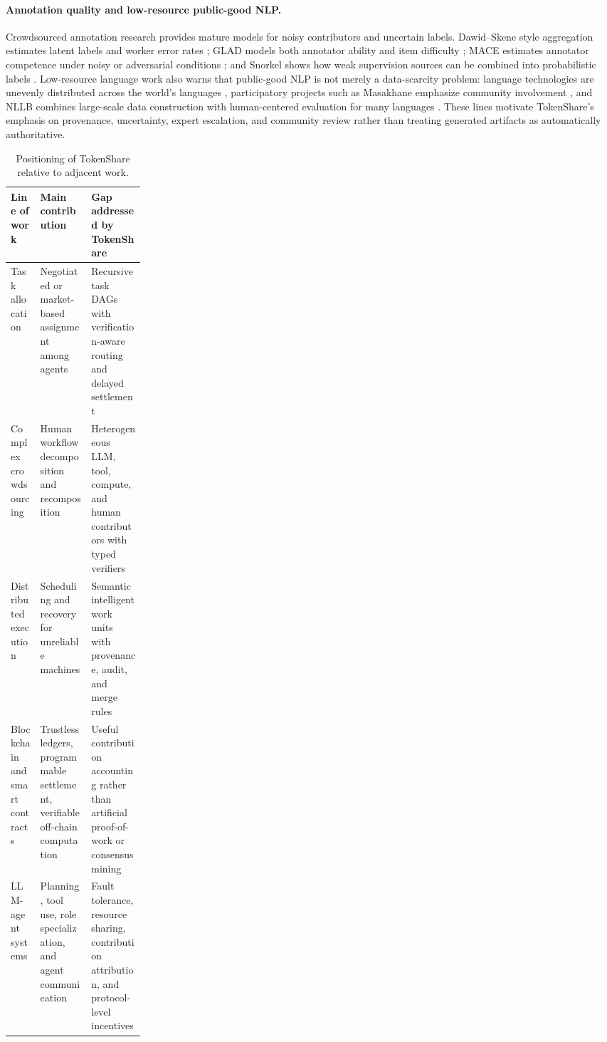\documentclass{article}
\theoremstyle{plain}
\begin{document}
\paragraph{Annotation quality and low-resource public-good NLP.}
Crowdsourced annotation research provides mature models for noisy contributors and uncertain labels. Dawid--Skene style aggregation estimates latent labels and worker error rates \citep{dawid1979maximum}; GLAD models both annotator ability and item difficulty \citep{whitehill2009glad}; MACE estimates annotator competence under noisy or adversarial conditions \citep{hovy2013mace}; and Snorkel shows how weak supervision sources can be combined into probabilistic labels \citep{ratner2017snorkel}. Low-resource language work also warns that public-good NLP is not merely a data-scarcity problem: language technologies are unevenly distributed across the world's languages \citep{joshi2020state}, participatory projects such as Masakhane emphasize community involvement \citep{nekoto2020participatory}, and NLLB combines large-scale data construction with human-centered evaluation for many languages \citep{nllb2022}. These lines motivate TokenShare's emphasis on provenance, uncertainty, expert escalation, and community review rather than treating generated artifacts as automatically authoritative.





\begin{table}[t]
\centering
\small
\caption{Positioning of TokenShare relative to adjacent work.}
\label{tab:related_positioning}
\begin{tabularx}{\linewidth}{p{0.22\linewidth} X X}
\toprule
Line of work & Main contribution & Gap addressed by TokenShare \\
\midrule
Task allocation & Negotiated or market-based assignment among agents & Recursive task DAGs with verification-aware routing and delayed settlement \\
Complex crowdsourcing & Human workflow decomposition and recomposition & Heterogeneous LLM, tool, compute, and human contributors with typed verifiers \\
Distributed execution & Scheduling and recovery for unreliable machines & Semantic intelligent work units with provenance, audit, and merge rules \\
Blockchain and smart contracts & Trustless ledgers, programmable settlement, verifiable off-chain computation & Useful contribution accounting rather than artificial proof-of-work or consensus mining \\
LLM-agent systems & Planning, tool use, role specialization, and agent communication & Fault tolerance, resource sharing, contribution attribution, and protocol-level incentives \\
\bottomrule
\end{tabularx}
\end{table}
\end{document}
